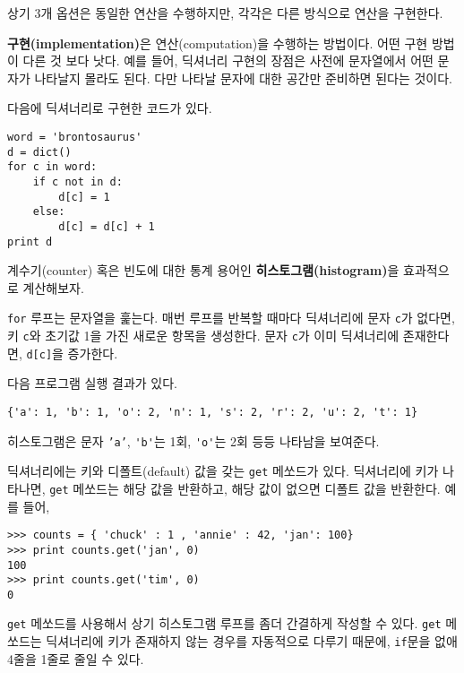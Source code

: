 상기 3개 옵션은 동일한 연산을 수행하지만, 각각은 다른 방식으로 연산을 구현한다.


{\bf 구현(implementation)}은 연산(computation)을 수행하는 방법이다. 
어떤 구현 방법이 다른 것 보다 낫다.
예를 들어, 딕셔너리 구현의 장점은 사전에 문자열에서 어떤 문자가 나타날지 몰라도 된다. 다만 나타날 문자에 대한 공간만 준비하면 된다는 것이다.

다음에 딕셔너리로 구현한 코드가 있다.

\beforeverb
\begin{verbatim}
word = 'brontosaurus'
d = dict()
for c in word:
    if c not in d:
        d[c] = 1
    else:
        d[c] = d[c] + 1
print d
\end{verbatim}
\afterverb
%

계수기(counter) 혹은 빈도에 대한 통계 용어인 {\bf 히스토그램(histogram)}을 효과적으로 계산해보자.


{\tt for} 루프는 문자열을 훑는다. 매번 루프를 반복할 때마다 딕셔너리에 문자 {\tt c}가 없다면, 키 {\tt c}와 초기값 1을 가진 새로운 항목을 생성한다.
문자 {\tt c}가 이미 딕셔너리에 존재한다면, {\tt d[c]}을 증가한다.


다음 프로그램 실행 결과가 있다.

\beforeverb
\begin{verbatim}
{'a': 1, 'b': 1, 'o': 2, 'n': 1, 's': 2, 'r': 2, 'u': 2, 't': 1}
\end{verbatim}
\afterverb
%

히스토그램은 문자 {\tt 'a'}, \verb"'b'"는 1회, \verb"'o'"는 2회 등등 나타남을 보여준다.


딕셔너리에는 키와 디폴트(default) 값을 갖는 {\tt get} 메쏘드가 있다. 
딕셔너리에 키가 나타나면, {\tt get} 메쏘드는 해당 값을 반환하고, 해당 값이 없으면 디폴트 값을 반환한다. 예를 들어,

\beforeverb
\begin{verbatim}
>>> counts = { 'chuck' : 1 , 'annie' : 42, 'jan': 100}
>>> print counts.get('jan', 0)
100
>>> print counts.get('tim', 0)
0
\end{verbatim}
\afterverb
%

{\tt get} 메쏘드를 사용해서 상기 히스토그램 루프를 좀더 간결하게 작성할 수 있다.
{\tt get} 메쏘드는 딕셔너리에 키가 존재하지 않는 경우를 자동적으로 다루기 때문에, {\tt if}문을 없애 4줄을 1줄로 줄일 수 있다.

